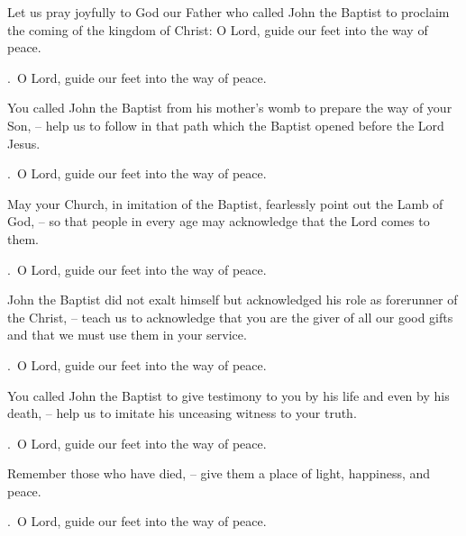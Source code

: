 \lettrine[loversize=0.15,lines=2]{L}{}et us pray joyfully to God our Father who called John the Baptist to proclaim the coming of the kingdom of Christ: O Lord, guide our feet into the way of peace.
\par \Rbar.~O Lord, guide our feet into the way of peace.

You called John the Baptist from his mother’s womb to prepare the way of your Son,
– help us to follow in that path which the Baptist opened before the Lord Jesus.
\par \Rbar.~O Lord, guide our feet into the way of peace.

May your Church, in imitation of the Baptist, fearlessly point out the Lamb of God,
– so that people in every age may acknowledge that the Lord comes to them.
\par \Rbar.~O Lord, guide our feet into the way of peace.

John the Baptist did not exalt himself but acknowledged his role as forerunner of the Christ,
– teach us to acknowledge that you are the giver of all our good gifts and that we must use them in your service.
\par \Rbar.~O Lord, guide our feet into the way of peace.

You called John the Baptist to give testimony to you by his life and even by his death,
– help us to imitate his unceasing witness to your truth.
\par \Rbar.~O Lord, guide our feet into the way of peace.

Remember those who have died,
– give them a place of light, happiness, and peace.
\par \Rbar.~O Lord, guide our feet into the way of peace.
